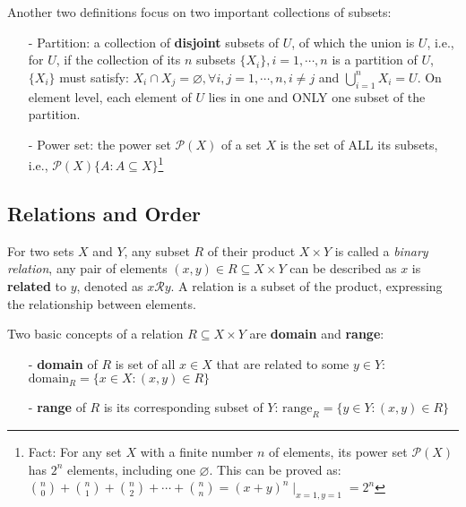 Another two definitions focus on two important collections of subsets:
\begin{definition}\label{def_collect_subset}
    \begin{enumerate}
        \item[-] Partition: a collection of \textbf{disjoint} subsets of $U$, of which the union is $U$, 
        i.e., for $U$, if the collection of its $n$ subsets $\{X_i\},i=1,\cdots,n$ is a partition of $U$, 
        $\{X_i\}$ must satisfy: $X_i\cap X_j=\varnothing, \forall i,j=1,\cdots,n,i\neq j$ and $\bigcup^n_{i=1} X_i=U$. On element level,
        each element of $U$ lies in one and ONLY one subset of the partition.
        \item[-] Power set: the power set $\mathcal{P}(X)$ of a set $X$ is the set of ALL its subsets, 
        i.e., $\mathcal{P}(X)\{A:A\subseteq X \}$\footnote{Fact: For any set $X$ with a finite number $n$ of elements, its power set $\mathcal{P}(X)$ has $2^n$ elements, including one $\varnothing$. This can be proved as: $\binom{n}{0}+\binom{n}{1}+\binom{n}{2}+\cdots+\binom{n}{n}=(x+y)^n \mid_{x=1,y=1}=2^n$}
    \end{enumerate}
\end{definition}

\subsection{Relations and Order}
For two sets $X$ and $Y$, any subset $R$ of their product $X\times Y$ is called a \textit{binary relation}, any pair of elements $(x,y)\in R\subseteq X\times Y$ can be described as $x$ is \textbf{related} to $y$, denoted as $x\mathcal{R}y$. A relation is a subset of the product, expressing the relationship between elements.

Two basic concepts of a relation $R\subseteq X\times Y$ are \textbf{domain} and \textbf{range}:
\begin{definition}
    \begin{enumerate}
        \item[-] \textbf{domain} of $R$ is set of all $x\in X$ that are related to some $y\in Y$: $\text{domain}_R = \{x\in X:(x,y)\in R\}$
        \item[-] \textbf{range} of $R$ is its corresponding subset of $Y$: $\text{range}_R = \{y \in Y: (x,y)\in R\}$
    \end{enumerate}
\end{definition}

